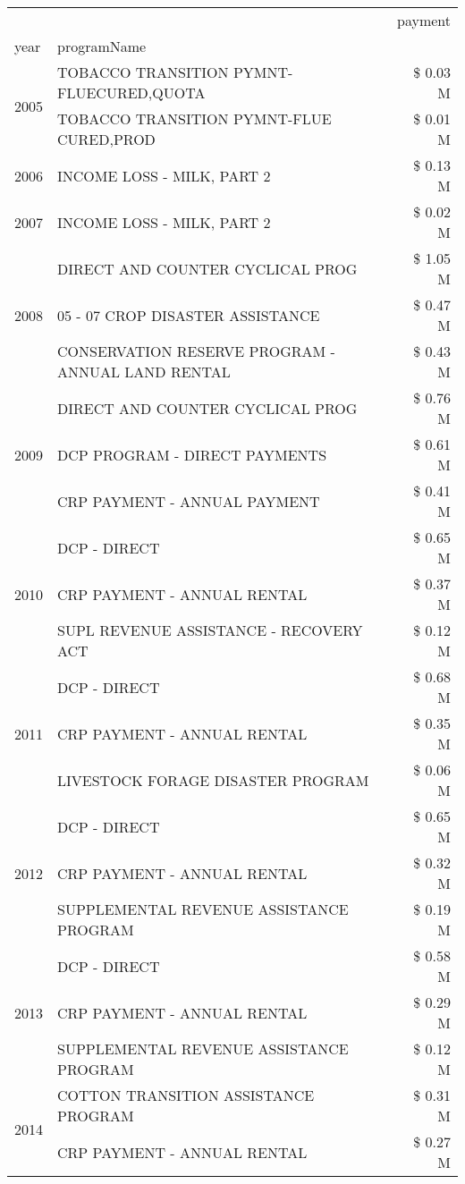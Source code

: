 \begin{tabular}{llr}
\toprule
 &  & payment \\
year & programName &  \\
\midrule
\multirow[t]{2}{*}{2005} & TOBACCO TRANSITION PYMNT-FLUECURED,QUOTA & \$ 0.03 M \\
 & TOBACCO TRANSITION PYMNT-FLUE CURED,PROD & \$ 0.01 M \\
\cline{1-3}
2006 & INCOME LOSS - MILK, PART 2 & \$ 0.13 M \\
\cline{1-3}
2007 & INCOME LOSS - MILK, PART 2 & \$ 0.02 M \\
\cline{1-3}
\multirow[t]{3}{*}{2008} & DIRECT AND COUNTER CYCLICAL PROG & \$ 1.05 M \\
 & 05 - 07 CROP DISASTER ASSISTANCE & \$ 0.47 M \\
 & CONSERVATION RESERVE PROGRAM - ANNUAL LAND RENTAL & \$ 0.43 M \\
\cline{1-3}
\multirow[t]{3}{*}{2009} & DIRECT AND COUNTER CYCLICAL PROG & \$ 0.76 M \\
 & DCP PROGRAM - DIRECT PAYMENTS & \$ 0.61 M \\
 & CRP PAYMENT - ANNUAL PAYMENT & \$ 0.41 M \\
\cline{1-3}
\multirow[t]{3}{*}{2010} & DCP - DIRECT & \$ 0.65 M \\
 & CRP PAYMENT - ANNUAL RENTAL & \$ 0.37 M \\
 & SUPL REVENUE ASSISTANCE - RECOVERY ACT & \$ 0.12 M \\
\cline{1-3}
\multirow[t]{3}{*}{2011} & DCP - DIRECT & \$ 0.68 M \\
 & CRP PAYMENT - ANNUAL RENTAL & \$ 0.35 M \\
 & LIVESTOCK FORAGE DISASTER PROGRAM & \$ 0.06 M \\
\cline{1-3}
\multirow[t]{3}{*}{2012} & DCP - DIRECT & \$ 0.65 M \\
 & CRP PAYMENT - ANNUAL RENTAL & \$ 0.32 M \\
 & SUPPLEMENTAL REVENUE ASSISTANCE PROGRAM & \$ 0.19 M \\
\cline{1-3}
\multirow[t]{3}{*}{2013} & DCP - DIRECT & \$ 0.58 M \\
 & CRP PAYMENT - ANNUAL RENTAL & \$ 0.29 M \\
 & SUPPLEMENTAL REVENUE ASSISTANCE PROGRAM & \$ 0.12 M \\
\cline{1-3}
\multirow[t]{3}{*}{2014} & COTTON TRANSITION ASSISTANCE PROGRAM & \$ 0.31 M \\
 & CRP PAYMENT - ANNUAL RENTAL & \$ 0.27 M \\

\end{tabular}
